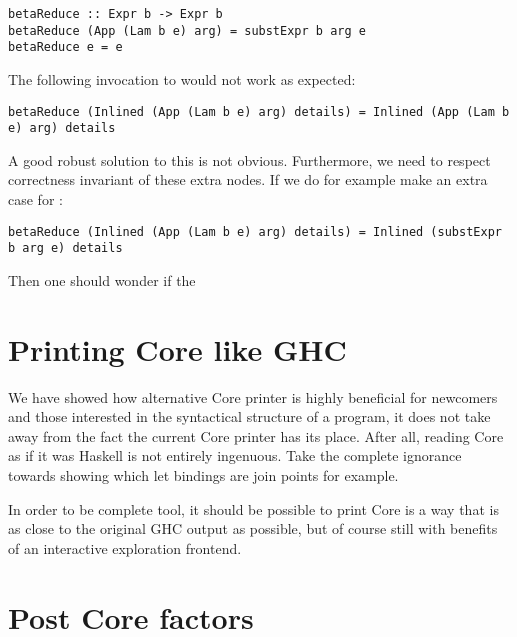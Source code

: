 \begin{listing}[H]
\begin{verbatim}
betaReduce :: Expr b -> Expr b
betaReduce (App (Lam b e) arg) = substExpr b arg e
betaReduce e = e
\end{verbatim}
\end{listing}

The following invocation to  would not work as expected:

\begin{listing}[H]
\begin{verbatim}
betaReduce (Inlined (App (Lam b e) arg) details) = Inlined (App (Lam b e) arg) details
\end{verbatim}
\end{listing}

A good robust solution to this is not obvious. Furthermore, we need to respect correctness invariant of these extra nodes. If we do for example make
an extra case for :

\begin{listing}[H]
\begin{verbatim}
betaReduce (Inlined (App (Lam b e) arg) details) = Inlined (substExpr b arg e) details
\end{verbatim}
\end{listing}

Then one should wonder if the  




\section{Printing Core like GHC}

We have showed how alternative Core printer is highly beneficial for newcomers and those interested in the syntactical structure of a program,
it does not take away from the fact the current Core printer has its place. After all, reading Core as if it was Haskell is not entirely
ingenuous. Take the complete ignorance towards showing which let bindings are join points for example. 

In order to be complete tool, it should be possible to print Core is a way that is as close to the original GHC output as possible, but of
course still with benefits of an interactive exploration frontend.

\section{Post Core factors}

